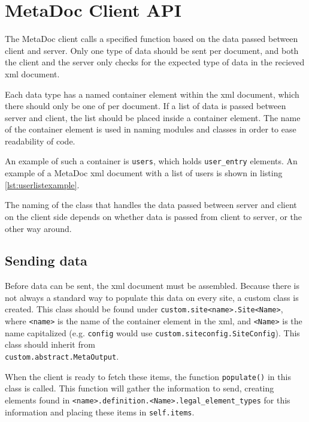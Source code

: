 \newpage
\section{MetaDoc Client API}
\label{sec:client_api}

The MetaDoc client calls a specified function based on the data passed between
client and server. Only one type of data should be sent per document, and both
the client and the server only checks for the expected type of data in the
recieved \gls{xml} document. 

Each data type has a named container element within the \gls{xml} document,
which there should only be one of per document. If a list of data is passed
between server and client, the list should be placed inside a container
element. The name of the container element is used in naming modules and
classes in order to ease readability of code. 

An example of such a container is \texttt{users}, which holds
\texttt{user\_entry} elements. An example of a MetaDoc \gls{xml} document with
a list of users is shown in listing \ref{lst:userlistexample}.


The naming of the class that handles the data passed between server and client
on the client side depends on whether data is passed from client to server, or
the other way around. 

\subsection{Sending data}
\label{sec:customizing_client_send}
Before data can be sent, the \gls{xml} document must be assembled. Because
there is not always a standard way to populate this data on every site, a
custom class is created. This class should be found under
\texttt{custom.site<name>.Site<Name>}, where \texttt{<name>} is the name of the
container element in the \gls{xml}, and \texttt{<Name>} is the name capitalized
(e.g.  \texttt{config} would use \texttt{custom.siteconfig.SiteConfig}). This
class should inherit from \\ \texttt{custom.abstract.MetaOutput}. 

When the client is ready to fetch these items, the function \texttt{populate()}
in this class is called. This function will gather the information to send,
creating elements found in
\texttt{<name>.definition.<Name>.legal\_element\_types} for this information
and placing these items in \texttt{self.items}. 

